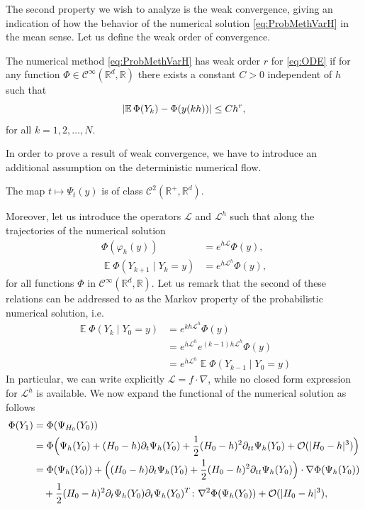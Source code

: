 \documentclass{siamart1116}
\numberwithin{theorem}{section}
\DeclarePairedDelimiter{\abs}{\lvert}{\rvert}
\renewcommand{\phi}{\varphi}
\newcommand{\R}{\mathbb{R}}
\newcommand{\OO}{\mathcal{O}}
\newcommand{\diffL}{\mathcal{L}}
\newcommand{\E}{\operatorname{\mathbb{E}}}
\newcommand{\corr}[1]{{\color{bordeaux}#1}}
\begin{document}
The second property we wish to analyze is the weak convergence, giving an indication of how the behavior of the numerical solution \eqref{eq:ProbMethVarH} in the mean sense. Let us define the weak order of convergence. 
\begin{definition} The numerical method \eqref{eq:ProbMethVarH} has weak order $r$ for \eqref{eq:ODE} if for any function $\Phi\in \mathcal C^\infty(\R^d, \R)$ there exists a constant $C > 0$ independent of $h$ such that
	\begin{equation}
	\abs{\E\Phi(Y_k) - \Phi(y(kh))} \leq Ch^r,
	\end{equation}
	for all $k = 1, 2, \ldots, N$.
\end{definition} 
\corr{In order to prove a result of weak convergence, we have to introduce an additional assumption on the deterministic numerical flow.
\begin{assumption}\label{as:PsiStrong_C2} The map $t \mapsto \Psi_t(y)$ is of class $\mathcal{C}^2(\R^+, \R^d)$. 
\end{assumption}}
Moreover, let us introduce the operators $\diffL$ and $\diffL^h$ such that \corr{along the trajectories of the numerical solution}
\begin{equation}
\begin{aligned}
	\Phi(\phi_h(y)) &= e^{h\diffL}\Phi(y),\\
	\E \Phi(Y_{k+1}\mid Y_k = y) &= e^{h\diffL^h}\Phi(y),
\end{aligned}
\end{equation}
for all functions $\Phi$ in $\mathcal{C}^{\infty}(\R^d, \R)$. \corr{Let us remark that the second of these relations can be addressed to as the Markov property of the probabilistic numerical solution, i.e.
\begin{equation}\label{eq:MarkovProperty}
\begin{aligned}
	\E \Phi(Y_{k}\mid Y_0 = y) &= e^{kh\diffL^h}\Phi(y)\\
		&= e^{h\diffL^h}e^{(k-1)h\diffL^h}\Phi(y)\\
		&= e^{h\diffL^h}\E \Phi(Y_{k-1}\mid Y_0 = y)
\end{aligned}
\end{equation}}
In particular, we can write explicitly $\diffL = f\cdot \nabla$, while no closed form expression for $\diffL^h$ is available. We now expand the functional of the numerical solution as follows
\begin{equation}
\begin{aligned}
	\Phi(Y_1) &= \Phi(\Psi_{H_0}(Y_0)) \\
	&= \Phi\Big(\Psi_h(Y_0) + (H_0-h)\partial_t\Psi_h(Y_0) + \frac{1}{2}(H_0-h)^2\partial_{tt}\Psi_h(Y_0) + \OO(\abs{H_0 - h}^3)\Big)\\
	&= \Phi(\Psi_h(Y_0)) + \Big((H_0 - h)\partial_t\Psi_h(Y_0)+\frac{1}{2}(H_0-h)^2\partial_{tt}\Psi_h(Y_0)\Big) \cdot \nabla\Phi(\Psi_h(Y_0))\\
	&\quad + \frac{1}{2}(H_0 - h)^2 \partial_t \Psi_h(Y_0) \partial_t \Psi_h(Y_0)^T \colon \nabla^2\Phi(\Psi_h(Y_0)) + \OO(\abs{H_0 - h}^3),
\end{aligned}
\end{equation}
\end{document}
